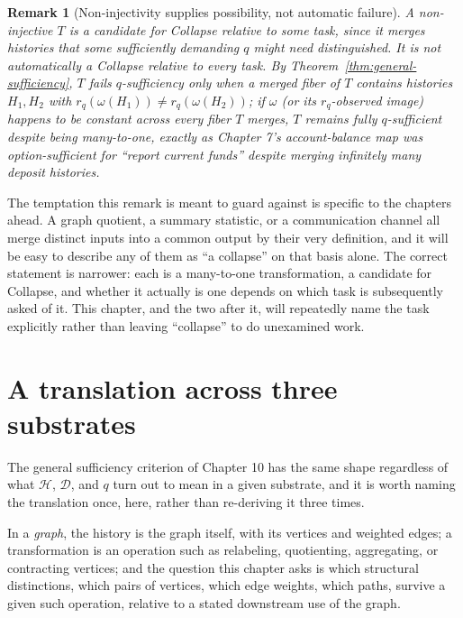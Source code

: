 \documentclass[11pt]{book}
\newtheorem{remark}[theorem]{Remark}
\begin{document}
\begin{remark}[Non-injectivity supplies possibility, not automatic failure]
\label{rem:possibility-not-failure}
A non-injective $T$ is a \emph{candidate} for Collapse relative to some task, since it merges histories that some sufficiently demanding $q$ might need distinguished. It is not automatically a Collapse relative to \emph{every} task. By Theorem~\ref{thm:general-sufficiency}, $T$ fails $q$-sufficiency only when a merged fiber of $T$ contains histories $H_1,H_2$ with $r_q(\omega(H_1))\ne r_q(\omega(H_2))$; if $\omega$ (or its $r_q$-observed image) happens to be constant across every fiber $T$ merges, $T$ remains fully $q$-sufficient despite being many-to-one, exactly as Chapter 7's account-balance map was option-sufficient for ``report current funds'' despite merging infinitely many deposit histories.
\end{remark}

The temptation this remark is meant to guard against is specific to the chapters ahead. A graph quotient, a summary statistic, or a communication channel all merge distinct inputs into a common output by their very definition, and it will be easy to describe any of them as ``a collapse'' on that basis alone. The correct statement is narrower: each is a many-to-one transformation, a candidate for Collapse, and whether it actually is one depends on which task is subsequently asked of it. This chapter, and the two after it, will repeatedly name the task explicitly rather than leaving ``collapse'' to do unexamined work.

\section{A translation across three substrates}

The general sufficiency criterion of Chapter 10 has the same shape regardless of what $\mathcal H$, $\mathcal D$, and $q$ turn out to mean in a given substrate, and it is worth naming the translation once, here, rather than re-deriving it three times.

In a \emph{graph}, the history is the graph itself, with its vertices and weighted edges; a transformation is an operation such as relabeling, quotienting, aggregating, or contracting vertices; and the question this chapter asks is which structural distinctions, which pairs of vertices, which edge weights, which paths, survive a given such operation, relative to a stated downstream use of the graph.
\end{document}
